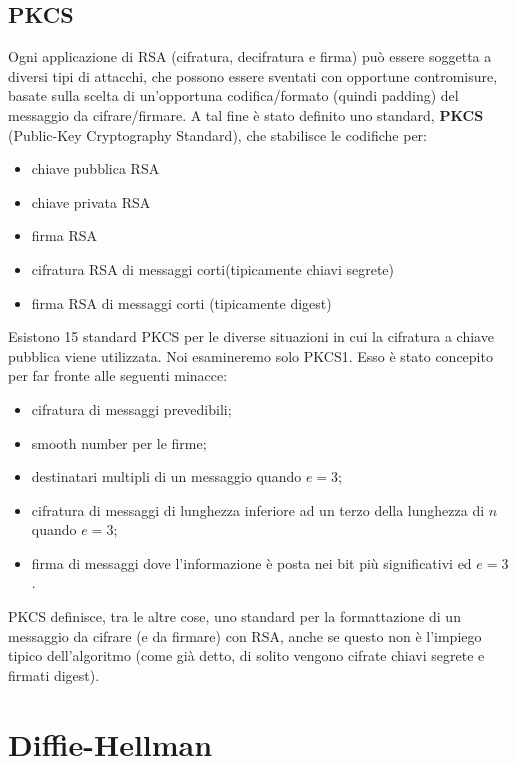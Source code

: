 \subsection{PKCS} \label{sec:pkcs}
Ogni applicazione di RSA (cifratura, decifratura e firma) può essere soggetta a diversi tipi di attacchi, che possono essere sventati con opportune contromisure, basate sulla scelta di un'opportuna codifica/formato (quindi padding) del messaggio da cifrare/firmare. A tal fine è stato definito uno standard, \textbf{PKCS} (Public-Key Cryptography Standard), che stabilisce le codifiche per:
\begin{itemize}
\item chiave pubblica RSA
\item chiave privata RSA
\item firma RSA
\item cifratura RSA di messaggi corti(tipicamente chiavi segrete)
\item firma RSA di messaggi corti (tipicamente digest)
\end{itemize}
Esistono 15 standard PKCS per le diverse situazioni in cui la cifratura a chiave pubblica viene utilizzata. Noi esamineremo solo PKCS1. Esso è stato concepito per far fronte alle seguenti minacce:
\begin{itemize}
\item cifratura di messaggi prevedibili;
\item smooth number per le firme;
\item destinatari multipli di un messaggio quando $e=3$;
\item cifratura di messaggi di lunghezza inferiore ad un terzo della lunghezza di $n$ quando $e=3$;
\item firma di messaggi dove l'informazione è posta nei bit più significativi ed $e = 3$.
\end{itemize}
PKCS definisce, tra le altre cose, uno standard per la formattazione di un messaggio da cifrare (e da firmare) con RSA, anche se questo non è l'impiego tipico dell'algoritmo (come già detto, di solito vengono cifrate chiavi segrete e firmati digest). 

\section{Diffie-Hellman}

